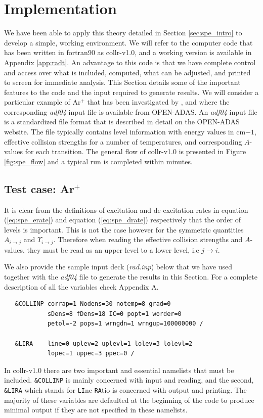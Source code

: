 \section{Implementation}\label{sec:spe_imp}
We have been able to apply this theory detailed in Section \ref{sec:spe_intro} to develop a simple, working environment. We will refer to the computer code that has been written in {\sc fortran90} as {\sc collr-v1.0}, and a working version is available in Appendix \ref{app:radt}. An advantage to this code is that we have complete control and access over what is included, computed, what can be adjusted, and printed to screen for immediate analysis. This Section details some of the important features to the code and the input required to generate results. We will consider a particular example of Ar$^+$ that has been investigated by \citet{2007JPhB...40.4537G}, and where the corresponding \textit{adf04} input file is available from OPEN-ADAS. An \textit{adf04} input file is a standardized file format that is described in detail on the OPEN-ADAS website. The file typically contains level information with energy values in cm$-1$, effective collision strengths for a number of temperatures, and corresponding $A$-values for each transition. The general flow of {\sc collr-v1.0} is presented in Figure \ref{fig:spe_flow} and a typical run is completed within minutes.

\subsection{Test case: Ar$^+$}
It is clear from the definitions of excitation and de-excitation rates in equation (\ref{eq:spe_erate}) and equation (\ref{eq:spe_drate}) respectively that the order of levels is important. This is not the case however for the symmetric quantities $A_{i\rightarrow j}$ and $\Upsilon_{i\rightarrow j}$. Therefore when reading the effective collision strengths and $A$-values, they must be read as an upper level to a lower level, i.e $j\rightarrow i$.

We also provide the sample input deck (\textit{rad.inp}) below that we have used together with the \textit{adf04} file to generate the results in this Section. For a complete description of all the variables check Appendix A.
\begin{verbatim}
   &COLLINP corrap=1 Nodens=30 notemp=8 grad=0
            sDens=8 fDens=18 IC=0 popt=1 worder=0 
            petol=-2 pops=1 wrngdn=1 wrngup=100000000 /
                       
   &LIRA    line=0 uplev=2 uplevl=1 lolev=3 lolevl=2 
            lopec=1 uppec=3 ppec=0 /
\end{verbatim}
In {\sc collr-v1.0} there are two important and essential namelists that must be included. \texttt{\&COLLINP} is mainly concerned with input and reading, and the second, \texttt{\&LIRA} which stands for \texttt{LI}ne \texttt{RA}tio is concerned with output and printing. The majority of these variables are defaulted at the beginning of the code to produce minimal output if they are not specified in these namelists.

